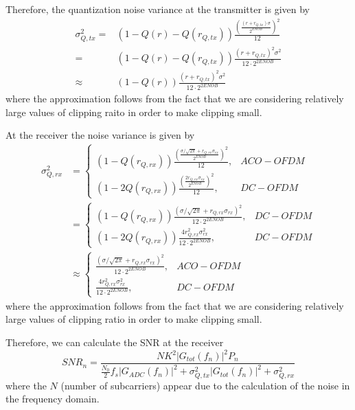 \documentclass[a4paper]{article}
\begin{document}
Therefore, the quantization noise variance at the transmitter is given by
\begin{align} \nonumber
\sigma^2_{Q, tx} = & (1-Q(r)-Q(r_{Q,tx}))\frac{(\frac{(r + r_{Q,tx})\sigma}{2^{ENOB}})^2}{12} \\ \nonumber
= & (1-Q(r)-Q(r_{Q,tx}))\frac{(r + r_{Q,tx})^2\sigma^2}{12\cdot 2^{2ENOB}} \\ 
\approx & (1-Q(r))\frac{(r + r_{Q,tx})^2\sigma^2}{12\cdot 2^{2ENOB}}
\end{align}
where the approximation follows from the fact that we are considering relatively large values of clipping raito in order to make clipping small.

At the receiver the noise variance is given by
\begin{align} \nonumber
\sigma^2_{Q,rx} & = \begin{cases}
(1-Q(r_{Q,rx}))\frac{(\frac{\sigma/\sqrt{2\pi} + r_{Q,rx}\sigma_{rx}}{2^{ENOB}})^2}{12}, & ACO-OFDM \\
(1-2Q(r_{Q,rx}))\frac{(\frac{2r_{Q,rx}\sigma_{rx}}{2^{ENOB}})^2}{12}, & DC-OFDM
\end{cases} \\ \nonumber
& = \begin{cases}
(1-Q(r_{Q,rx}))\frac{(\sigma/\sqrt{2\pi} + r_{Q,rx}\sigma_{rx})^2}{12\cdot 2^{2ENOB}}, & DC-OFDM \\
(1-2Q(r_{Q,rx}))\frac{4r_{Q,rx}^2\sigma_{rx}^2}{12\cdot 2^{2ENOB}}, & DC-OFDM
\end{cases} \\
& \approx \begin{cases}
\frac{(\sigma/\sqrt{2\pi} + r_{Q,rx}\sigma_{rx})^2}{12\cdot 2^{2ENOB}}, & ACO-OFDM \\
\frac{4r_{Q,rx}^2\sigma_{rx}^2}{12\cdot 2^{2ENOB}}, & DC-OFDM
\end{cases}
\end{align}
where the approximation follows from the fact that we are considering relatively large values of clipping ratio in order to make clipping small.

Therefore, we can calculate the SNR at the receiver
\begin{equation}
SNR_n = \frac{NK^2|G_{tot}(f_n)|^2P_n}{\frac{N_0}{2}f_s|G_{ADC}(f_n)|^2 + \sigma_{Q,tx}^2|G_{tot}(f_n)|^2 + \sigma_{Q,rx}^2}
\end{equation}
where the $N$ (number of subcarriers) appear due to the calculation of the noise in the frequency domain. 
\end{document}
